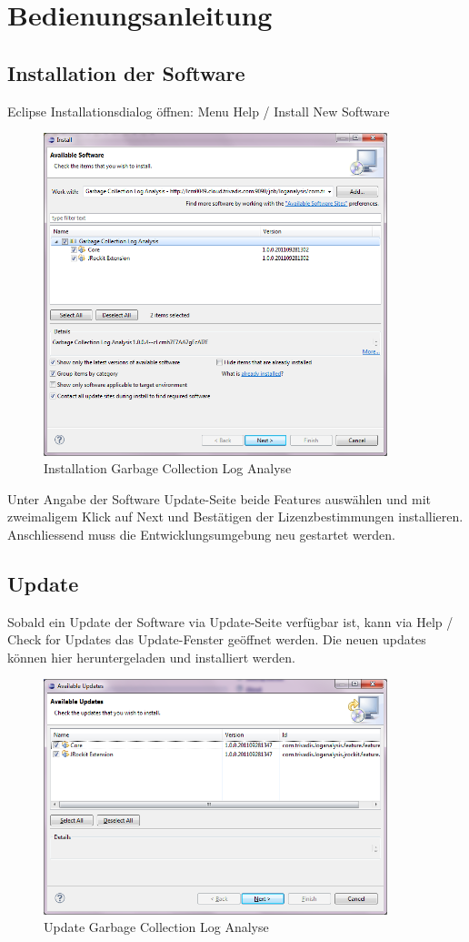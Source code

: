 \chapter{Bedienungsanleitung}
\section{Installation der Software}
Eclipse Installationsdialog öffnen: Menu Help / Install New Software
 \begin{figure}[H]
  	\centering
    	\includegraphics[width=10cm]{images/tutorial_install01}
        	\caption{Installation Garbage Collection Log Analyse}
\end{figure}
Unter Angabe der Software Update-Seite beide Features auswählen und mit zweimaligem Klick auf Next und Bestätigen der Lizenzbestimmungen installieren. Anschliessend muss die Entwicklungsumgebung neu gestartet werden.


\section{Update}
Sobald ein Update der Software via Update-Seite verfügbar ist, kann via Help / Check for Updates das Update-Fenster geöffnet werden. Die neuen updates können hier heruntergeladen und installiert werden.
 \begin{figure}[H]
  	\centering
    	\includegraphics[width=10cm]{images/tutorial_update01}
        	\caption{Update Garbage Collection Log Analyse}
\end{figure}

